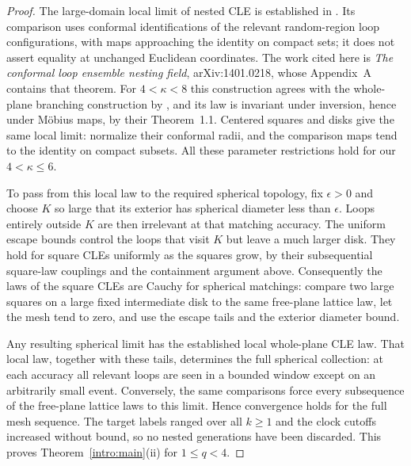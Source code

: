 \begin{proof}
The large-domain local limit of nested CLE is established in
\citet[Appendix~A, Theorem~A.1]{MillerWatsonWilson2015}.  Its comparison
uses conformal identifications of the relevant random-region loop
configurations, with maps approaching the identity on compact sets;
it does not assert equality at unchanged Euclidean coordinates.
The work cited here is \emph{The conformal loop ensemble nesting
field}, arXiv:1401.0218, whose Appendix~A contains that theorem.
For $4<\kappa<8$ this construction agrees with the whole-plane
branching construction by
\citet[Remark~2.6]{GwynneMillerQian2021}, and its law is invariant
under inversion, hence under M\"obius maps, by their Theorem~1.1.
Centered squares and disks give the same local limit: normalize their
conformal radii, and the comparison maps tend to the identity on
compact subsets.  All these parameter restrictions hold for our
$4<\kappa\le6$.

To pass from this local law to the required spherical topology, fix
$\epsilon>0$ and choose $K$ so large that its exterior has spherical
diameter less than $\epsilon$.  Loops entirely outside $K$ are then
irrelevant at that matching accuracy.  The uniform escape bounds
control the loops that visit $K$ but leave a much larger disk.  They
hold for square CLEs uniformly as the squares grow, by their
subsequential square-law couplings and the containment argument above.
Consequently the laws of the square CLEs are Cauchy for spherical
matchings: compare two large squares on a large fixed intermediate
disk to the same free-plane lattice law, let the mesh tend to zero,
and use the escape tails and the exterior diameter bound.

Any resulting spherical limit has the established local whole-plane
CLE law.  That local law, together with these tails, determines the
full spherical collection: at each accuracy all relevant loops are
seen in a bounded window except on an arbitrarily small event.
Conversely, the same comparisons force every subsequence of the
free-plane lattice laws to this limit.  Hence convergence holds for
the full mesh sequence.  The target labels ranged over all $k\ge1$
and the clock cutoffs increased without bound, so no nested generations
have been discarded.  This proves Theorem~\ref{intro:main}(ii) for $1\le q<4$.
\end{proof}
